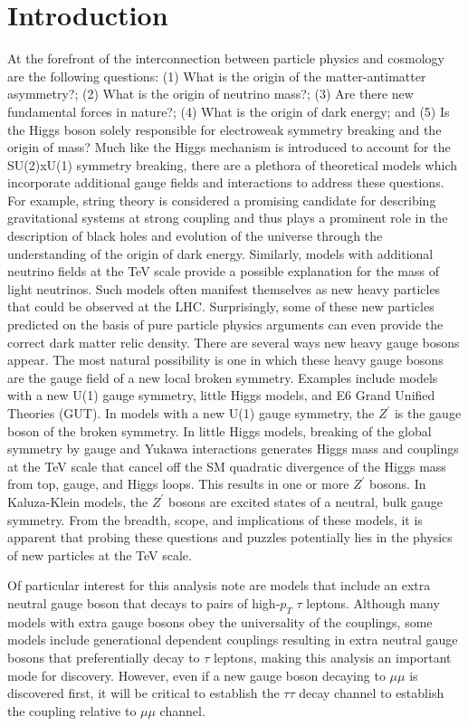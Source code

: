 \section{Introduction}\label{sec:intro}

At the forefront of the interconnection between particle physics and cosmology are the following questions: (1) What is the origin of the matter-antimatter 
asymmetry?; (2) What is the origin of neutrino mass?; (3) Are there new fundamental forces in nature?; (4) What is the origin of dark energy; and (5) Is the Higgs 
boson solely responsible for electroweak symmetry breaking and the origin of mass? Much like the Higgs mechanism is introduced to account for the SU(2)xU(1) 
symmetry breaking, there are a plethora of theoretical models which incorporate additional gauge fields and interactions to address these questions. For example, 
string theory is considered a promising candidate for describing gravitational systems at strong coupling and thus plays a prominent role in the description of 
black holes and evolution of the universe through the understanding of the origin of dark energy. Similarly, models with additional neutrino fields at the TeV 
scale provide a possible explanation for the mass of light neutrinos. Such models often manifest themselves as new heavy particles that could be observed at the 
LHC. Surprisingly, some of these new particles predicted on the basis of pure particle physics arguments can even provide the correct dark matter relic density. 
There are several ways new heavy gauge bosons appear. The most natural possibility is one in which these heavy gauge bosons are the gauge field of a new 
local broken symmetry. Examples include models with a new U(1) gauge symmetry, little Higgs models, and E6 Grand Unified Theories (GUT). 
In models with a new U(1) gauge symmetry, the $Z^\prime$ is the gauge boson of the broken symmetry. In
little Higgs models, breaking of the global symmetry by gauge and Yukawa interactions generates Higgs mass and couplings at the TeV scale that cancel off the SM
quadratic divergence of the Higgs mass from top, gauge, and Higgs loops. This results in one or more $Z^\prime$ bosons. In Kaluza-Klein models, the $Z^\prime$
bosons are excited states of a neutral, bulk gauge symmetry.
From the breadth, scope, and implications of these models, it is apparent that probing these questions and puzzles potentially lies in the physics of new
particles at the TeV scale. 

Of particular interest for this analysis note are models that include an extra neutral gauge boson that decays to pairs of high-$p_{T}$ $\tau$ leptons. Although 
many models with extra gauge bosons obey the universality of the couplings, some models include generational dependent couplings resulting in extra neutral gauge 
bosons that preferentially decay to $\tau$ leptons, making this analysis an important mode for discovery. However, even if a new gauge boson decaying to $\mu\mu$ 
is discovered first, it will be critical to establish the $\tau\tau$ decay channel to establish the coupling relative to $\mu\mu$ channel.
